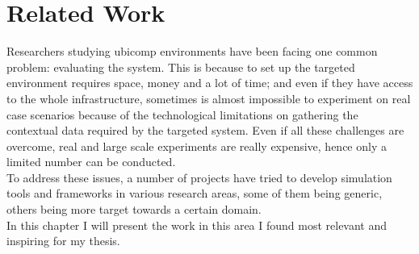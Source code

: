 \chapter{Related Work}\label{ch:related_work}

Researchers studying ubicomp environments have been facing one common problem: evaluating the system. This is because to set up the targeted environment requires space, money and a lot of time; and even if they have access to the whole infrastructure, sometimes is almost impossible to experiment on real case scenarios because of the technological limitations on gathering the contextual data required by the targeted system. Even if all these challenges are overcome, real and large scale experiments are really expensive, hence only a limited number can be conducted.\\

To address these issues, a number of projects have tried to develop simulation tools and frameworks in various research areas, some of them being generic, others being more target towards a certain domain.\\

In this chapter I will present the work in this area I found most relevant and inspiring for my thesis.











